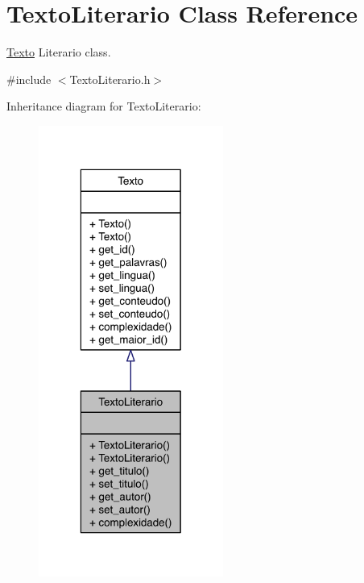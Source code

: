 \hypertarget{class_texto_literario}{\section{Texto\-Literario Class Reference}
\label{class_texto_literario}
}


\hyperlink{class_texto}{Texto} Literario class.  




{\ttfamily \#include $<$Texto\-Literario.\-h$>$}



Inheritance diagram for Texto\-Literario\-:
\nopagebreak
\begin{figure}[H]
\begin{center}
\leavevmode
\includegraphics[width=172pt]{class_texto_literario__inherit__graph}
\end{center}
\end{figure}


